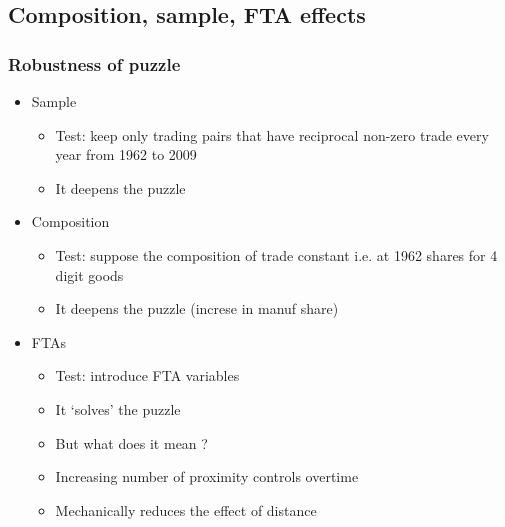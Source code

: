 \documentclass{beamer}
\begin{document}
\subsection{Composition, sample, FTA effects}
\begin{frame}\frametitle{Robustness of puzzle}
\vspace{0.3cm}
\begin{itemize}
\item Sample
\begin{itemize}
\item Test: keep only trading pairs that have reciprocal non-zero trade every year from 1962 to 2009
\item It deepens the puzzle 
\end{itemize}
\vspace{0.3cm}
\item Composition
\begin{itemize}
\item Test: suppose the composition of trade constant i.e. at 1962 shares for 4 digit goods
\item It deepens the puzzle (increse in manuf share)
\end{itemize}
\vspace{0.3cm}
\item FTAs
\begin{itemize}
\item Test: introduce FTA variables
\item It `solves' the puzzle
\item But what does it mean ? 
\item Increasing number of proximity controls overtime 
\item Mechanically reduces the effect of distance
\end{itemize}
\end{itemize}
\end{frame}
\end{document}
